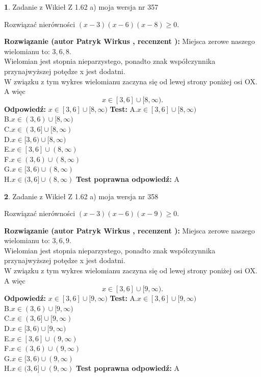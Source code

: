 \documentclass[12pt, a4paper]{article}
\theoremstyle{definition} %
\newtheorem{zad}{}
\newcommand{\zadStart}[1]{\begin{zad}#1\newline}
\newcommand{\zadStop}{\end{zad}}
\newcommand{\rozwStart}[2]{\noindent \textbf{Rozwiązanie (autor #1 , recenzent #2): }\newline}
\newcommand{\rozwStop}{\newline}
\newcommand{\odpStart}{\noindent \textbf{Odpowiedź:}\newline}
\newcommand{\odpStop}{\newline}
\newcommand{\testStart}{\noindent \textbf{Test:}\newline}
\newcommand{\testStop}{\newline}
\newcommand{\kluczStart}{\noindent \textbf{Test poprawna odpowiedź:}\newline}
\newcommand{\kluczStop}{\newline}
\begin{document}
\zadStart{Zadanie z Wikieł Z 1.62 a) moja wersja nr 357}

Rozwiązać nierówności $(x-3)(x-6)(x-8)\ge0$.
\zadStop
\rozwStart{Patryk Wirkus}{}
Miejsca zerowe naszego wielomianu to: $3, 6, 8$.\\
Wielomian jest stopnia nieparzystego, ponadto znak współczynnika przy\linebreak najwyższej potędze x jest dodatni.\\ W związku z tym wykres wielomianu zaczyna się od lewej strony poniżej osi OX. A więc $$x \in [3,6] \cup [8,\infty).$$
\rozwStop
\odpStart
$x \in [3,6] \cup [8,\infty)$
\odpStop
\testStart
A.$x \in [3,6] \cup [8,\infty)$\\
B.$x \in (3,6) \cup [8,\infty)$\\
C.$x \in (3,6] \cup [8,\infty)$\\
D.$x \in [3,6) \cup [8,\infty)$\\
E.$x \in [3,6] \cup (8,\infty)$\\
F.$x \in (3,6) \cup (8,\infty)$\\
G.$x \in [3,6) \cup (8,\infty)$\\
H.$x \in (3,6] \cup (8,\infty)$
\testStop
\kluczStart
A
\kluczStop



\zadStart{Zadanie z Wikieł Z 1.62 a) moja wersja nr 358}

Rozwiązać nierówności $(x-3)(x-6)(x-9)\ge0$.
\zadStop
\rozwStart{Patryk Wirkus}{}
Miejsca zerowe naszego wielomianu to: $3, 6, 9$.\\
Wielomian jest stopnia nieparzystego, ponadto znak współczynnika przy\linebreak najwyższej potędze x jest dodatni.\\ W związku z tym wykres wielomianu zaczyna się od lewej strony poniżej osi OX. A więc $$x \in [3,6] \cup [9,\infty).$$
\rozwStop
\odpStart
$x \in [3,6] \cup [9,\infty)$
\odpStop
\testStart
A.$x \in [3,6] \cup [9,\infty)$\\
B.$x \in (3,6) \cup [9,\infty)$\\
C.$x \in (3,6] \cup [9,\infty)$\\
D.$x \in [3,6) \cup [9,\infty)$\\
E.$x \in [3,6] \cup (9,\infty)$\\
F.$x \in (3,6) \cup (9,\infty)$\\
G.$x \in [3,6) \cup (9,\infty)$\\
H.$x \in (3,6] \cup (9,\infty)$
\testStop
\kluczStart
A
\kluczStop
\end{document}
